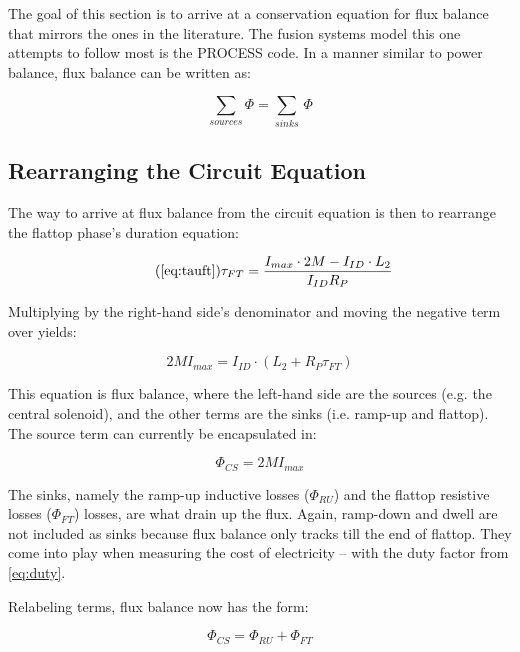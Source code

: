 The goal of this section is to arrive at a conservation equation for flux balance that mirrors the ones in the literature. The fusion systems model this one attempts to follow most is the PROCESS code.\cite{process} In a manner similar to power balance, flux balance can be written as:

\begin{equation}
	\sum_{sources} \Phi = \sum_{sinks} \, \Phi
\end{equation}

\subsection{Rearranging the Circuit Equation}

The way to arrive at flux balance from the circuit equation is then to rearrange the flattop phase's duration equation:

\begin{equation}
	\tag{\ref{eq:tauft}}
	\tau_{FT} = \frac{ I_{max} \cdot 2 M - I_{ID} \cdot  L_2 }{I_{ID} R_P}
\end{equation}

Multiplying by the right-hand side's denominator and moving the negative term over yields:

\begin{equation}
	2 M I_{max} = I_{ID} \cdot \left( L_2 + R_P \tau_{FT} \right) 
\end{equation}

This equation is flux balance, where the left-hand side are the sources (e.g. the central solenoid), and the other terms are the sinks (i.e. ramp-up and flattop). The source term can currently be encapsulated in:

\begin{equation}
	\label{eq:phics}
	\Phi_{CS} = 2 M I_{max}
\end{equation}

The sinks, namely the ramp-up inductive losses ($\Phi_{RU}$) and the flattop resistive losses ($\Phi_{FT}$) losses, are what drain up the flux. Again, ramp-down and dwell are not included as sinks because flux balance only tracks till the end of flattop. They come into play when measuring the cost of electricity -- with the duty factor from \cref{eq:duty}.

Relabeling terms, flux balance now has the form:

\begin{equation}
	\Phi_{CS} = \Phi_{RU} + \Phi_{FT}
\end{equation}

